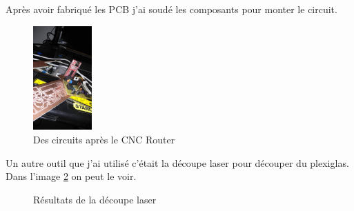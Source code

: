 \documentclass[12pt]{article}
\begin{document}
\begin{par}
	Après avoir fabriqué les PCB j'ai soudé les composants pour monter le
	circuit.
\end{par}

\begin{figure}[!htb]
\centering
\includegraphics[width=0.2\textwidth]{img/CircuitosCNCed.jpg}
\caption{Des circuits après le CNC Router}
\label{img:CircuitsCNCd}
\end{figure}
Un autre outil que j'ai utilisé c'était la découpe laser pour découper du plexiglas. Dans l'image \ref{img:barriere} on peut le voir.


\begin{figure}[!htb]
	\centering
	\caption{Résultats de la découpe laser}
	\label{img:barriere}
\end{figure}

\end{document}
